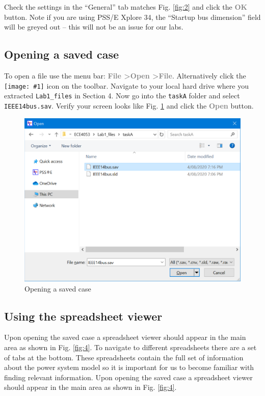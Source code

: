 \documentclass[paper=a4, fontsize=11pt]{article}
\newcommand{\mychar}[1]{%
  \begingroup\normalfont
  \texttt{[image: \#1]}%
  \endgroup
}
\begin{document}
Check the settings in the ``General'' tab matches Fig. \ref{fig:2} and click the \textbf{\textcolor{gray}{OK}} button. Note if you are using PSS/E Xplore 34, the ``Startup bus dimension'' field will be greyed out -- this will not be an issue for our labs.


\subsection{Opening a saved case}
To open a file use the menu bar: \textbf{\textcolor{gray}{File \textgreater \phantom{ }Open \textgreater \phantom{ }File}}. Alternatively click the \mychar{open.png} icon on the toolbar. Navigate to your local hard drive where you extracted \texttt{Lab1\_files} in Section 4. Now go into the \texttt{taskA} folder and select \texttt{IEEE14bus.sav}. Verify your screen looks like Fig. \ref{fig:3} and click the \textbf{\textcolor{gray}{Open}} button.

\begin{figure}[h]
\centering
\includegraphics[scale=0.32]{fig3_opensav.pdf}
\caption{Opening a saved case}
\label{fig:3}
\end{figure}

\newpage
\subsection{Using the spreadsheet viewer}
Upon opening the saved case a spreadsheet viewer should appear in the main area as shown in Fig. \ref{fig:4}. To navigate to different spreadsheets there are a set of tabs at the bottom. These spreadsheets contain the full set of information about the power system model so it is important for us to become familiar with finding relevant information. Upon opening the saved case a spreadsheet viewer should appear in the main area as shown in Fig. \ref{fig:4}. 
\end{document}
